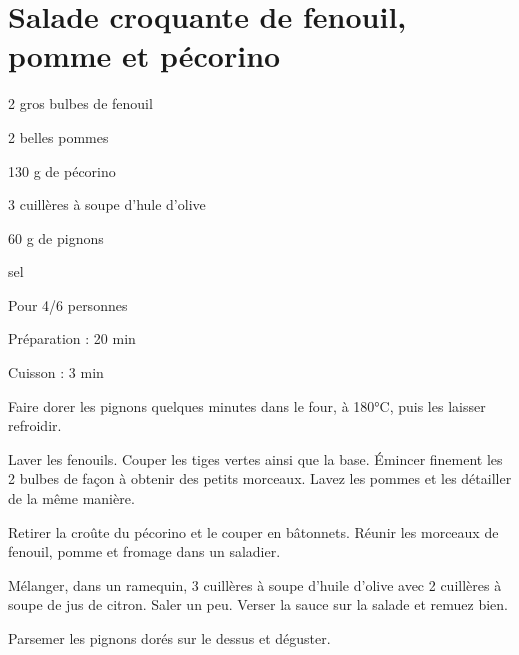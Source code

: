 \section{Salade croquante de fenouil, pomme et pécorino}

\begin{ingredients}
\item 2 gros bulbes de fenouil
\item 2 belles pommes
\item 130 g de pécorino 
\item 3 cuillères à soupe d'hule d'olive
\item 60 g de pignons
\item sel
\end{ingredients}
\begin{infos}
\item Pour 4/6 personnes		%
\item Préparation : 20 min		%
\item Cuisson : 3 min			%
\end{infos}
\begin{etapes}
\item Faire dorer les pignons quelques minutes dans le four, à 180°C, puis les laisser refroidir.
\item Laver les fenouils. Couper les tiges vertes ainsi que la base. Émincer finement les 2 bulbes de façon à obtenir des petits morceaux. Lavez les pommes et les détailler de la même manière.
\item Retirer la croûte du pécorino et le couper en bâtonnets. Réunir les morceaux de fenouil, pomme et fromage dans un saladier.
\item Mélanger, dans un ramequin, 3 cuillères à soupe d'huile d'olive avec 2 cuillères à soupe de jus de citron. Saler un peu. Verser la sauce sur la salade et remuez bien.
\item Parsemer les pignons dorés sur le dessus et déguster.
\end{etapes}
